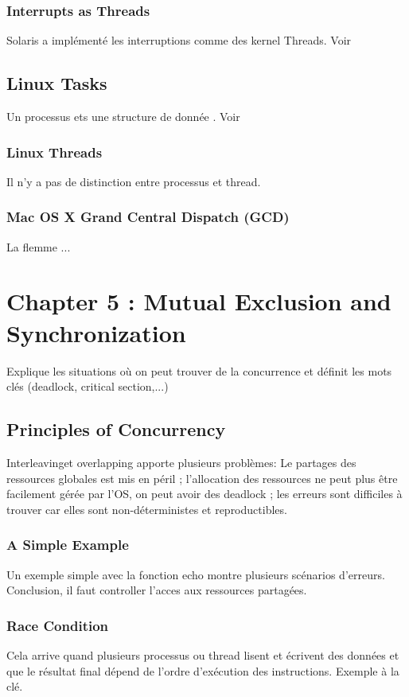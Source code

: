 \subsubsection{Interrupts as Threads}
Solaris a implémenté les interruptions comme des kernel Threads. Voir \cite[p.~206]{stallings}
\subsection{Linux Tasks}
Un processus ets une structure de donnée . Voir \cite[p.~207]{stallings}
\subsubsection{Linux Threads}
Il n'y a pas de distinction entre processus et thread.
\subsubsection{Mac OS X Grand Central Dispatch (GCD)}
La flemme ...

\newpage



\section{Chapter 5 : Mutual Exclusion and Synchronization}

Explique les situations où on peut trouver de la concurrence et définit les mots clés (deadlock, critical section,...)
\subsection{Principles of Concurrency}
Interleavinget overlapping apporte plusieurs problèmes: Le partages des ressources globales est mis en péril ; l'allocation des ressources ne peut plus être facilement gérée par l'OS, on peut avoir des deadlock ; les erreurs sont difficiles à trouver car elles sont non-déterministes et reproductibles.
\subsubsection{A Simple Example}
Un exemple simple avec la fonction echo montre plusieurs scénarios d'erreurs. Conclusion, il faut controller l'acces aux ressources partagées.
\subsubsection{Race Condition}
Cela arrive quand plusieurs processus ou thread lisent et écrivent des données et que le résultat final dépend de l'ordre d'exécution des instructions. Exemple à la clé.
